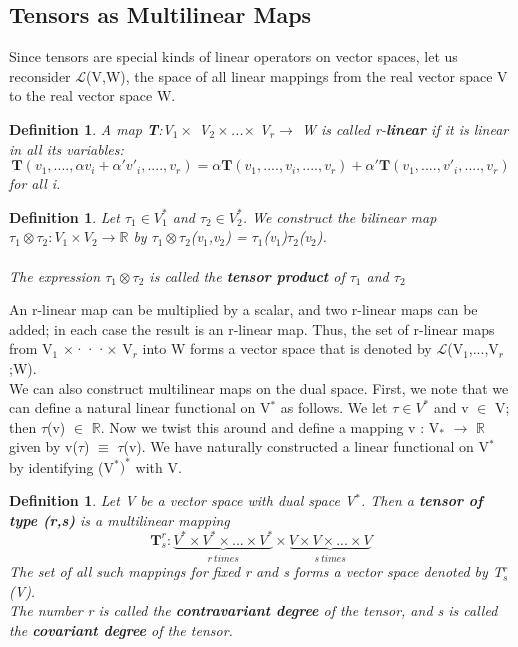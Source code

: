 \documentclass[12pt,a4paper]{article}
\newtheorem{defn}[thm]{Definition}
\begin{document}
\subsection{Tensors as Multilinear Maps}
Since tensors are special kinds of linear operators on vector spaces, let us reconsider $\mathcal{L}$(V,W), the space of all linear mappings from the real vector space V to the real vector space W. 
\begin{defn}
A map \textbf{T}:V$_1\times$ V$_2\times $...$\times$ V$_r\to$ W is called r-\textbf{linear} if it is linear in all its variables:\begin{equation}
\textbf{T}(v_1,....,\alpha v_i + \alpha'v'_i,....,v_r) = \alpha\textbf{T}(v_1,....,v_i,....,v_r) + \alpha'\textbf{T}(v_1,....,v'_i,....,v_r) 
\end{equation}
for all i.
\end{defn}
\begin{defn}
Let $\tau_1\in V^*_1$ and $\tau_2\in V^*_2$. We construct the bilinear map $\tau_1\otimes \tau_2:V_1\times V_2\to \mathbb{R}$ by $\tau_1\otimes \tau_2$(v$_1$,v$_2$) = $\tau_1$(v$_1$)$\tau_2$(v$_2$). \\\\The expression $\tau_1\otimes \tau_2$ is called the \textbf{tensor product} of $\tau_1$ and $\tau_2$
\end{defn}
An r-linear map can be multiplied by a scalar, and two r-linear maps can
be added; in each case the result is an r-linear map. Thus, the set of r-linear
maps from V$_1$ $\times$···$\times$ V$_r$ into W forms a vector space that is denoted by
$\mathcal{L}$(V$_1$,...,V$_r$;W).\\

We can also construct multilinear maps on the dual space. First, we note
that we can define a natural linear functional on V$^*$ as follows. We let $\tau \in V^* $
and v $\in$ V; then $\tau$(v) $\in$ $\mathbb{R}$. Now we twist this around and define a mapping
v : V$_*$ $\to$ $\mathbb{R}$ given by v($\tau$) $\equiv$ $\tau$(v). We have naturally constructed a linear functional on V$^*$ by
identifying (V$^*)^*$ with V.
\begin{defn}
Let V be a vector space with dual space V$^*$. Then a \textbf{tensor of type (r,s)} is a multilinear mapping\begin{equation}
\textbf{T} ^r_s:\underbrace{V^*\times V^*\times ... \times V^*}_{r\ times}\times\underbrace{V\times V\times...\times V}_{s\ times}
\end{equation}
The set of all such mappings for fixed r and s forms a vector space denoted
by T$^r_s$ (V). \\The number r is called the \textbf{contravariant degree} of the tensor,
and s is called the \textbf{covariant degree} of the tensor.\\\\
\end{defn}
\end{document}
